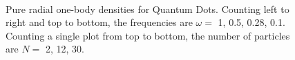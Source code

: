 \begin{figure}
\begin{center}
   \\
  \caption{Pure radial one-body densities for Quantum Dots. Counting left to right and top to bottom, the frequencies are $\omega=$ 1, 0.5, 0.28, 0.1. Counting a single plot from top to bottom, the number of particles are $N=$ 2, 12, 30.}
  \label{fig:OBD_RAD_QDOTS_odd}

\end{center}
\end{figure}
